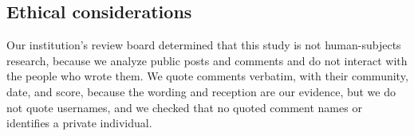 \subsection{Ethical considerations}
\label{sec:data-ethics}

Our institution's review board determined that this study is not human-subjects research, because we analyze public posts and comments and do not interact with the people who wrote them. We quote comments verbatim, with their community, date, and score, because the wording and reception are our evidence, but we do not quote usernames, and we checked that no quoted comment names or identifies a private individual.